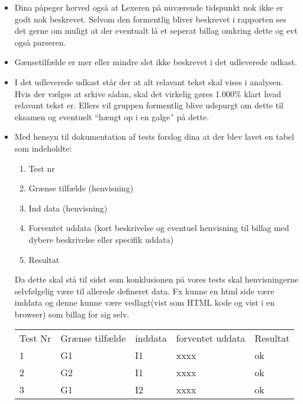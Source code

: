 \documentclass[a4paper,10pt,draft]{article}
\begin{document}
\begin{itemize}
\item Dina påpeger herved også at Lexeren på nuværende tidspunkt nok ikke er godt nok beskrevet. Selvom den formentlig bliver beskrevet i rapporten ses det gerne om muligt at der eventualt lå et seperat billag omkring dette og evt også parseren.

\item Gænsetilfælde er mer eller mindre slet ikke beskrevet i det udleverede udkast.

\item I det udleverede udkast står der at alt relavant tekst skal vises i analysen. Hvis der vælges at srkive sådan, skal det virkelig gøres 1.000\% klart hvad relavant tekst er. Ellers vil gruppen formentlig blive udspurgt om dette til eksamen og eventuelt ``hængt op i en galge'' på dette.

\item Med hensyn til dokumentation af tests forslog dina at der blev lavet en tabel som indeholdte: 
\begin{enumerate}
 \item Test nr
\item Grænse tilfælde (henvisning)
\item Ind data (henvisning)
\item Forventet uddata (kort beskrivelse og eventuel henvisning til billag med dybere beskrivelse eller specifik uddata)
\item Resultat
\end{enumerate}

Da dette skal stå til sidst som konklusionen på vores tests skal henvisningerne selvfølgelig være til allerede defineret data. Fx kunne en html side være inddata og denne kunne være vedlagt(vist som HTML kode og vist i en browser) som billag for sig selv.

\begin{center}
\begin{tabular}{lllll}
Test Nr & Grænse tilfælde & inddata & forventet uddata & Resultat \\ 
1 & G1 & I1 & xxxx & ok \\ 
2 & G2 & I1 & xxxx & ok \\ 
3 & G1 & I2 & xxxx & ok
\end{tabular}
\end{center}


\end{itemize}
\end{document}
